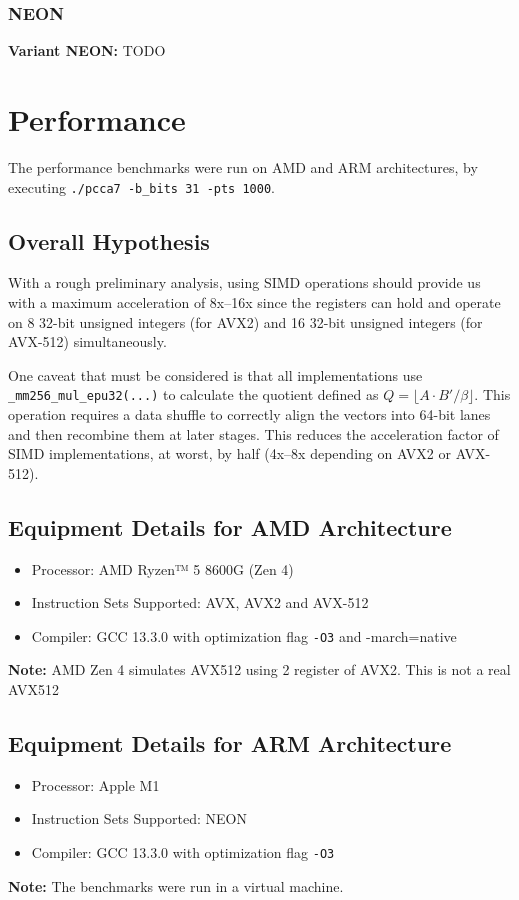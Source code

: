 \documentclass{article}
\newcommand{\pointlabel}[1]{\par\smallskip\noindent\textbf{\textcolor{accentorange}{#1:}} }
\begin{document}
\subsubsection{NEON}
\pointlabel{Variant NEON} TODO
\newpage


\section{Performance}
The performance benchmarks were run on AMD and ARM architectures, by executing \texttt{./pcca7 -b\_bits 31 -pts 1000}.
\subsection{Overall Hypothesis}
With a rough preliminary analysis, using SIMD operations should provide us with a maximum acceleration of 8x--16x since the registers can hold and operate on 8 32-bit unsigned integers (for AVX2) and 16 32-bit unsigned integers (for AVX-512) simultaneously.

One caveat that must be considered is that all implementations use \texttt{\_mm256\_mul\_epu32(...)} to calculate the quotient defined as $Q = \lfloor A \cdot B'/\beta \rfloor$. This operation requires a data shuffle to correctly align the vectors into 64-bit lanes and then recombine them at later stages. This reduces the acceleration factor of SIMD implementations, at worst, by half (4x--8x depending on AVX2 or AVX-512).

\subsection{Equipment Details for AMD Architecture}
\begin{itemize}
    \item Processor: AMD Ryzen™ 5 8600G (Zen 4)
    \item Instruction Sets Supported: AVX, AVX2 and AVX-512
    \item Compiler: GCC 13.3.0 with optimization flag \texttt{-O3} and -march=native
\end{itemize}
\pointlabel{Note} AMD Zen 4 simulates AVX512 using 2 register of AVX2. This is not a real AVX512

\subsection{Equipment Details for ARM Architecture}
\begin{itemize}
    \item Processor: Apple M1
    \item Instruction Sets Supported: NEON
    \item Compiler: GCC 13.3.0 with optimization flag \texttt{-O3}
\end{itemize}
\pointlabel{Note}The benchmarks were run in a virtual machine.
\end{document}
